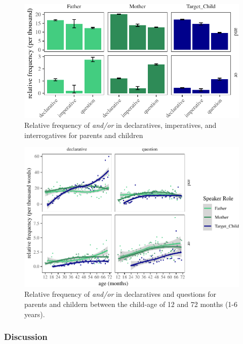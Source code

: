 \documentclass[floatsintext,man]{apa6}
\theoremstyle{definition}
\theoremstyle{definition}
\theoremstyle{definition}
\theoremstyle{remark}
\begin{document}
\begin{figure}[tb]

{\centering \includegraphics{figs/freqTablebySpeechAct-1} 

}

\caption{Relative frequency of \textit{and/or} in declaratives, imperatives, and interrogatives for parents and children }\label{fig:freqTablebySpeechAct}
\end{figure}

\begin{figure}[tb]

{\centering \includegraphics{figs/ageSpeechActPlot-1} 

}

\caption{Relative frequency of \textit{and/or} in declaratives and questions for parents and childern between the child-age of 12 and 72 months (1-6 years).}\label{fig:ageSpeechActPlot}
\end{figure}

\subsubsection{Discussion}\label{study1discussion}
\end{document}
